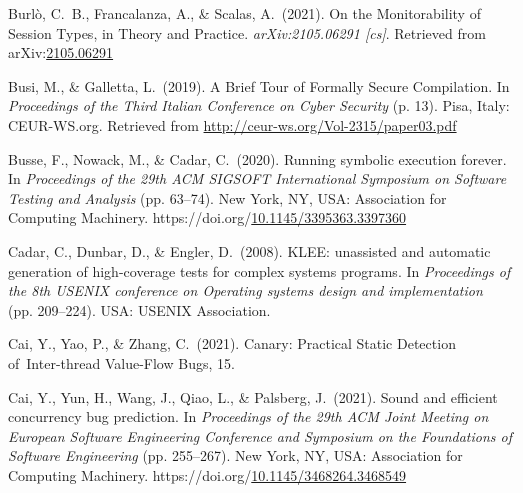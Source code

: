 \documentclass[12pt,twoside]{article}
\begin{document}
{\begin{thebibliography}{1079}
\mdbibitemlabel{}Burlò, C.~B., Francalanza, A., \& Scalas, A.~(2021). On the Monitorability of Session Types, in Theory and Practice. \emph{arXiv:2105.06291 {}[cs]}. Retrieved from arXiv:\href{http://arxiv.org/abs/2105.06291}{2105.06291}%

\mdbibitemlabel{}Busi, M., \& Galletta, L.~(2019). A Brief Tour of Formally Secure Compilation. In \emph{Proceedings of the Third Italian Conference on Cyber Security} (p. 13). Pisa, Italy: CEUR-WS.org. Retrieved from \href{http://ceur-ws.org/Vol-2315/paper03.pdf}{{\ttfamily http://\hspace{0pt}ceur-\hspace{0pt}ws.\hspace{0pt}org/\hspace{0pt}Vol-\hspace{0pt}2315/\hspace{0pt}paper03.\hspace{0pt}pdf}}%

\mdbibitemlabel{}Busse, F., Nowack, M., \& Cadar, C.~(2020). Running symbolic execution forever. In \emph{Proceedings of the 29th ACM SIGSOFT International Symposium on Software Testing and Analysis} (pp. 63–74). New York, NY, USA: Association for Computing Machinery. https://doi.org/\href{https://dx.doi.org/10.1145/3395363.3397360}{10.1145/3395363.3397360}%

\mdbibitemlabel{}Cadar, C., Dunbar, D., \& Engler, D.~(2008). KLEE: unassisted and automatic generation of high-coverage tests for complex systems programs. In \emph{Proceedings of the 8th USENIX conference on Operating systems design and implementation} (pp. 209–224). USA: USENIX Association.%

\mdbibitemlabel{}Cai, Y., Yao, P., \& Zhang, C.~(2021). Canary: Practical Static Detection of~Inter-thread Value-Flow Bugs, 15.%

\mdbibitemlabel{}Cai, Y., Yun, H., Wang, J., Qiao, L., \& Palsberg, J.~(2021). Sound and efficient concurrency bug prediction. In \emph{Proceedings of the 29th ACM Joint Meeting on European Software Engineering Conference and Symposium on the Foundations of Software Engineering} (pp. 255–267). New York, NY, USA: Association for Computing Machinery. https://doi.org/\href{https://dx.doi.org/10.1145/3468264.3468549}{10.1145/3468264.3468549}%


\end{thebibliography}}
\end{document}
